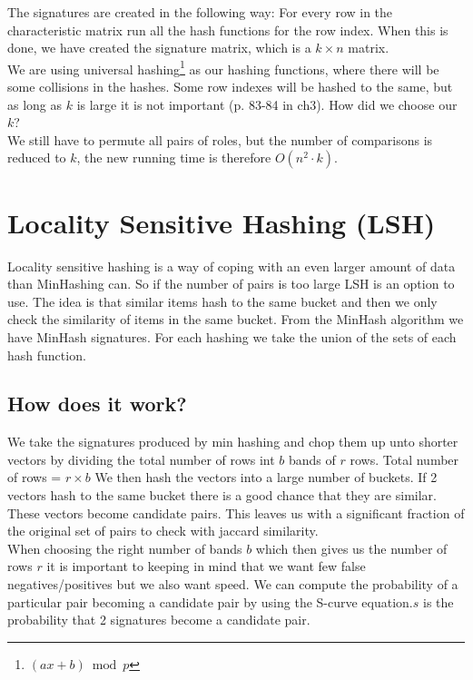 \documentclass[a4paper,11pt]{article}
\begin{document}
The signatures are created in the following way: For every row in the characteristic matrix run all the hash functions for the row index. When this is done, we have created the signature matrix, which is a $k\times n$ matrix.\\

We are using universal hashing\footnote{$(ax + b) \bmod p$} as our hashing functions, where there will be some collisions in the hashes. Some row indexes will be hashed to the same, but as long as $k$ is large it is not important (p. 83-84 in ch3). How did we choose our $k$? \\

We still have to permute all pairs of roles, but the number of comparisons is reduced to $k$, the new running time is therefore $O(n^2 \cdot k)$.

\section{Locality Sensitive Hashing (LSH)}
Locality sensitive hashing is a way of coping with an even larger amount of data than MinHashing can. So if the number of pairs is too large LSH is an option to use. The idea is that similar items hash to the same bucket and then we only check the similarity of items in the same bucket. From the MinHash algorithm we have MinHash signatures. For each hashing we take the union of the sets of each hash function.

\subsection{How does it work?}
We take the signatures produced by min hashing and chop them up unto shorter vectors by dividing the total number of rows int $b$ bands of $r$ rows. Total number of rows = $r\times b$ We then hash the vectors into a large number of buckets. If 2 vectors hash to the same bucket there is a good chance that they are similar. These vectors become candidate pairs. This leaves us with a significant fraction of the original set of pairs to check with jaccard similarity.\\

When choosing the right number of bands $b$ which then gives us the number of rows $r$ it is important to keeping in mind that we want few false negatives/positives but we also want speed. We can compute the probability of a particular pair becoming a candidate pair by using the S-curve equation.$s$ is the probability that 2 signatures become a candidate pair.
\end{document}
